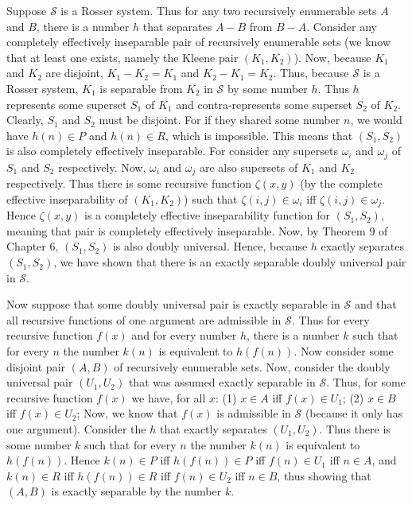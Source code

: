 \documentclass{article}
\theoremstyle{definition}
\begin{document}
Suppose $\mathcal{S}$ is a Rosser system. Thus for any two recursively enumerable sets $A$ and $B$, there is a number $h$ that separates $A-B$ from $B-A$. Consider any completely effectively inseparable pair of 
recursively enumerable sets (we know that at least one exists, namely the Kleene pair $(K_1,K_2)$). 
Now, because $K_1$ and $K_2$ are disjoint, $K_1-K_2=K_1$ and $K_2-K_1=K_2$. Thus, because $\mathcal{S}$ is a Rosser system, $K_1$ is separable from $K_2$ in $\mathcal{S}$ by some number $h$. Thus $h$ represents 
some superset $S_1$ of $K_1$ and contra-represents some superset $S_2$ of $K_2$. Clearly, $S_1$ and $S_2$ must be disjoint. For if they shared some number $n$, we would have $h(n)\in P$ and $h(n)\in R$, which is impossible. 
This means that $(S_1,S_2)$ is also completely effectively inseparable. 
For consider any supersets $\omega_i$ and $\omega_j$ of $S_1$ and $S_2$ respectively. Now, $\omega_i$ and $\omega_j$ are also supersets of $K_1$ and $K_2$ respectively. Thus there is some recursive function 
$\zeta(x,y)$ (by the complete effective inseparability of $(K_1,K_2)$) such that $\zeta(i,j)\in\omega_i$ iff $\zeta(i,j)\in\omega_j$. Hence $\zeta(x,y)$ is a completely effective inseparability function for 
$(S_1,S_2)$, meaning that pair is completely effectively inseparable. Now, by Theorem 9 of Chapter 6, $(S_1,S_2)$ is also doubly universal. Hence, because $h$ exactly separates $(S_1,S_2)$, we have shown that there is an 
exactly separable doubly universal pair in $\mathcal{S}$. 


Now suppose that some doubly universal pair is exactly separable in $\mathcal{S}$ and that all recursive functions of one argument are admissible in $\mathcal{S}$. Thus for every recursive function $f(x)$ and for 
every number $h$, there is a number $k$ such that for every $n$ the number $k(n)$ is equivalent to $h(f(n))$. Now consider some disjoint pair $(A,B)$ of recursively enumerable sets. Now, consider the doubly universal 
pair $(U_1,U_2)$ that was assumed exactly separable in $\mathcal{S}$. Thus, for some recursive function $f(x)$ we have, for all $x$:\newline
(1) $x\in A$ iff $f(x)\in U_1$;\newline
(2) $x\in B$ iff $f(x)\in U_2$;\newline
Now, we know that $f(x)$ is admissible in $\mathcal{S}$ (because it only has one argument). Consider the $h$ that exactly separates $(U_1,U_2)$. Thus there is some number $k$ such that for every $n$ the 
number $k(n)$ is equivalent to $h(f(n))$. Hence $k(n)\in P$ iff $h(f(n))\in P$ iff $f(n)\in U_1$ iff $n\in A$, and $k(n)\in R$ iff $h(f(n))\in R$ iff $f(n)\in U_2$ iff $n\in B$, thus showing that 
$(A,B)$ is exactly separable by the number $k$. 
\end{document}
